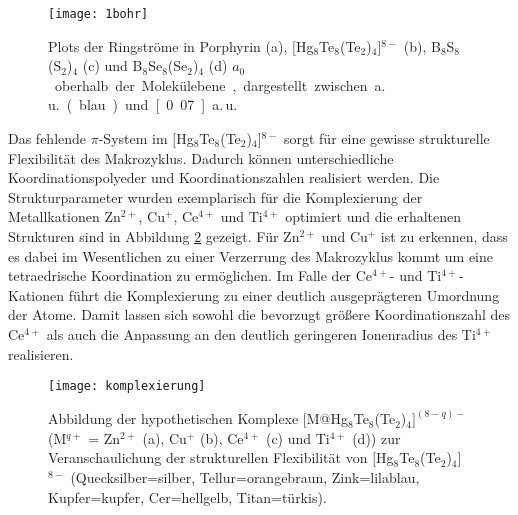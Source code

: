  

\begin{figure}[ht!]
	\centering
	\texttt{[image: 1bohr]}
	\captionsetup{figurewithin = chapter}
	\captionsetup{font=small, labelfont=bf}\caption[{Porphyrin, $[$Hg$_8$Te$_8$(Te$_2$)$_4$]$^{8-}$, B$_8$S$_8$(S$_2$)$_4$ und B$_8$Se$_8$(Se$_2$)$_4$: Plots der Ringströme}]{Plots der Ringströme in Porphyrin \textsf{(a)}, $[$Hg$_8$Te$_8$(Te$_2$)$_4$]$^{8-}$ \textsf{(b)}, B$_8$S$_8$(S$_2$)$_4$ \textsf{(c)} und B$_8$Se$_8$(Se$_2$)$_4$ \textsf{(d)} \unit[1]{$a_0$} oberhalb der Molekülebene, dargestellt zwischen \unit[0]{a.\,u.} (blau) und \unit[0.07]{a.\,u.}}
\label{abb:lic}
\end{figure}

\FloatBarrier
Das fehlende $\pi$-System im $[$Hg$_8$Te$_8$(Te$_2$)$_4$]$^{8-}$ sorgt für eine gewisse strukturelle Flexibilität des Makrozyklus. Dadurch können unterschiedliche Koordinationspolyeder und Koordinationszahlen realisiert werden. Die Strukturparameter wurden exemplarisch für die Komplexierung der Metallkationen Zn$^{2+}$, Cu$^+$, Ce$^{4+}$ und Ti$^{4+}$ optimiert und die erhaltenen Strukturen sind in Abbildung \ref{abb:komplexierung} gezeigt. Für Zn$^{2+}$ und Cu$^+$ ist zu erkennen, dass es dabei im Wesentlichen zu einer Verzerrung des Makrozyklus kommt um eine tetraedrische Koordination zu ermöglichen. Im Falle der Ce$^{4+}$- und Ti$^{4+}$-Kationen führt die Komplexierung zu einer deutlich ausgeprägteren Umordnung der Atome. Damit lassen sich sowohl die bevorzugt größere Koordinationszahl des Ce$^{4+}$ als auch die Anpassung an den deutlich geringeren Ionenradius des Ti$^{4+}$ realisieren.

\begin{figure}[ht!]
	\centering
	\texttt{[image: komplexierung]}
	\captionsetup{figurewithin = chapter}
	\captionsetup{font=small, labelfont=bf}\caption[{Abbildungen der hypothetischen Komplexe [M@Hg$_8$Te$_8$(Te$_2$)$_4]^{(8-q)-}$ (M$^{q+}$ = Zn$^{2+}$, Cu$^+$ , Ce$^{4+}$ und Ti$^{4+}$)}]{{Abbildung der hypothetischen Komplexe [M@Hg$_8$Te$_8$(Te$_2$)$_4]^{(8-q)-}$ (M$^{q+}$ = Zn$^{2+}$ \textsf{(a)}, Cu$^+$ \textsf{(b)}, Ce$^{4+}$ \textsf{(c)} und Ti$^{4+}$ \textsf{(d)})} zur Veranschaulichung der strukturellen Flexibilität von $[$Hg$_8$Te$_8$(Te$_2$)$_4$]$^{8-}$ (Quecksilber=silber, Tellur=orangebraun, Zink=lilablau, Kupfer=kupfer, Cer=hellgelb, Titan=türkis). }
\label{abb:komplexierung}
\end{figure}

